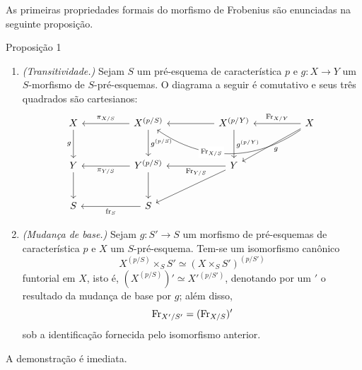 As primeiras propriedades formais do morfismo de Frobenius são enunciadas na seguinte proposição.

\begin{statement}{Proposição 1}
\begin{enumerate}[label=\alph*)]
\item \emph{(Transitividade.) } Sejam $S$ um pré-esquema de característica $p$ e $g:X\to Y$ um $S$-morfismo de $S$-pré-esquemas. O diagrama a seguir é comutativo e seus três quadrados são cartesianos:
\[
\begin{tikzcd}[column sep=huge,row sep=large]
X \arrow[d,"g"'] & X^{(p/S)} \arrow[l,"\pi_{X/S}"'] \arrow[d,"g^{(p/S)}"] & X^{(p/Y)} \arrow[l] \arrow[d,"g^{(p/Y)}"] & X \arrow[l,"\Fr_{X/Y}"'] \arrow[ll,bend left=35,"\Fr_{X/S}"{description,pos=0.62}] \arrow[dl,"g"] \\
Y \arrow[d] & Y^{(p/S)} \arrow[l,"\pi_{Y/S}"] \arrow[d] & Y \arrow[l,"\Fr_{Y/S}"] \arrow[dl] & {} \\
S & S \arrow[l,"\fr_S"] & {} & {}
\end{tikzcd}
\]

\item \emph{(Mudança de base.) } Sejam $g:S'\to S$ um morfismo de pré-esquemas de característica $p$ e $X$ um $S$-pré-esquema. Tem-se um isomorfismo canônico
\[
X^{(p/S)}\times_S S'\simeq (X\times_S S')^{(p/S')}
\]
funtorial em $X$, isto é, $(X^{(p/S)})'\simeq X'{}^{(p/S')}$, denotando por um $'$ o resultado da mudança de base por $g$; além disso,
\[
\operatorname{Fr}_{X'/S'}=(\operatorname{Fr}_{X/S})'
\]
sob a identificação fornecida pelo isomorfismo anterior.
\end{enumerate}
\end{statement}

A demonstração é imediata.
